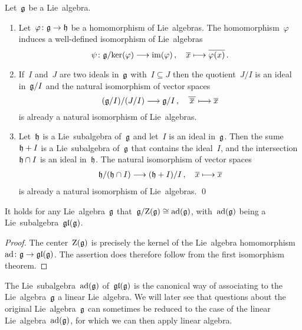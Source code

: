 

\begin{corollary}
  Let~$\mathfrak{g}$ be a Lie~algebra.
  \begin{enumerate}
    \item
      Let~$\varphi \colon \glie \to \hlie$ be a homomorphism of Lie~algebras.
      The homomorphism~$\varphi$ induces a well-defined isomorphism of Lie~algebras
      \[
        \psi
        \colon
        \glie / {\ker(\varphi)}
        \to
        \im(\varphi)  \,,
        \quad
        \class{x}
        \mapsto
        \class{\varphi(x)} \,.
      \]
    \item
      If~$I$ and~$J$ are two ideals in~$\mathfrak{g}$ with~$I \subseteq J$ then the quotient~$J/I$ is an ideal in~$\mathfrak{g}/I$ and the natural isomorphism of vector spaces
      \[
        (\glie/I) / (J/I)
        \to
        \glie/I \,,
        \quad
        \class{ \,\class{x}\, }
        \mapsto
        \class{x}
      \]
      is already a natural isomorphism of Lie~algebras.
    \item
      Let~$\mathfrak{h}$ is a Lie~subalgebra of~$\mathfrak{g}$ and let~$I$ is an ideal in~$\mathfrak{g}$.
      Then the sume~$\mathfrak{h} + I$ is a Lie~subalgebra of~$\mathfrak{g}$ that contains the ideal~$I$, and the intersection~$\mathfrak{h} \cap I$ is an ideal in~$\mathfrak{h}$.
      The natural isomorphism of vector spaces
      \begin{gather*}
        \hlie/(\hlie \cap I)
        \to
        (\hlie + I)/I \,,
        \quad
        \class{x}
        \mapsto
        \class{x}
      \end{gather*}
      is already a natural isomorphism of Lie~algebras.
    \qed
  \end{enumerate}
\end{corollary}


\begin{corollary}
  It holds for any Lie~algebra~$\mathfrak{g}$ that~$\mathfrak{g}/{\operatorname{Z}(\mathfrak{g})} \cong \operatorname{ad}(\mathfrak{g})$, with~$\operatorname{ad}(\mathfrak{g})$ being a Lie~subalgebra~$\mathfrak{gl}(\mathfrak{g})$.
\end{corollary}


\begin{proof}
  The center~$\operatorname{Z}(\mathfrak{g})$ is precisely the kernel of the Lie~algebra homomorphism~$\ad \colon \glie \to \gllie(\glie)$.
  The assertion does therefore follow from the first isomorphism theorem.
\end{proof}


\begin{remark}
  The Lie~subalgebra~$\operatorname{ad}(\mathfrak{g})$ of~$\mathfrak{gl}(\mathfrak{g})$ is the canonical way of associating to the Lie~algebra~$\mathfrak{g}$ a linear Lie~algebra.
  We will later see that questions about the original Lie~algebra~$\mathfrak{g}$ can sometimes be reduced to the case of the linear Lie~algebra~$\operatorname{ad}(\mathfrak{g})$, for which we can then apply linear algebra.
\end{remark}



